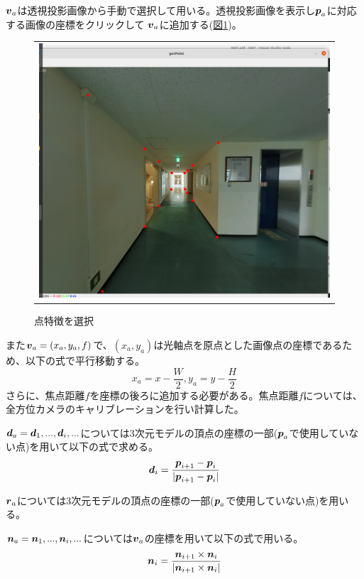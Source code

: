 \documentclass[]{jarticle}          %
\begin{document}
$\mbox{\boldmath $v$}_a$は透視投影画像から手動で選択して用いる。透視投影画像を表示し$\mbox{\boldmath $p$}_a$に対応する画像の座標をクリックして
$\mbox{\boldmath $v$}_a$に追加する(\hyperref[four]{図\ref{four}})。
\begin{figure}[!ht]
  \begin{center}
    \begin{tabular}{c}
      \includegraphics[keepaspectratio, scale=0.3]{figures/select_point.png}
    \end{tabular}
  \end{center}
  \caption{点特徴を選択}
  \label{four}
\end{figure}
また$\mbox{\boldmath $v$}_a=(x_a,y_a,f)$で、$(x_a,y_a)$は光軸点を原点とした画像点の座標であるため、以下の式で平行移動する。
\begin{equation}
  x_a = x - \frac{W}{2}, y_a = y - \frac{H}{2}
\end{equation}
さらに、焦点距離$f$を座標の後ろに追加する必要がある。焦点距離$f$については、全方位カメラのキャリブレーションを行い計算した。

$\mbox{\boldmath $d$}_a={\mbox{\boldmath $d$}_1,...,\mbox{\boldmath $d$}_i,...}$については3次元モデルの頂点の座標の一部($\mbox{\boldmath $p$}_a$で使用していない点)を用いて以下の式で求める。
\begin{equation}
  \mbox{\boldmath $d$}_i = \frac{\mbox{\boldmath $p$}_{i+1}-\mbox{\boldmath $p$}_{i}}{|\mbox{\boldmath $p$}_{i+1}-\mbox{\boldmath $p$}_{i}|}
\end{equation}

$\mbox{\boldmath $r$}_a$については3次元モデルの頂点の座標の一部($\mbox{\boldmath $p$}_a$で使用していない点)を用いる。

$\mbox{\boldmath $n$}_a={\mbox{\boldmath $n$}_1,...,\mbox{\boldmath $n$}_i,...}$については$\mbox{\boldmath $v$}_a$の座標を用いて以下の式で用いる。
\begin{equation}
  \mbox{\boldmath $n$}_i = \frac{\mbox{\boldmath $n$}_{i+1}\times{\mbox{\boldmath $n$}_{i}}}{|\mbox{\boldmath $n$}_{i+1}\times{\mbox{\boldmath $n$}_{i}}|}
\end{equation}
\end{document}
